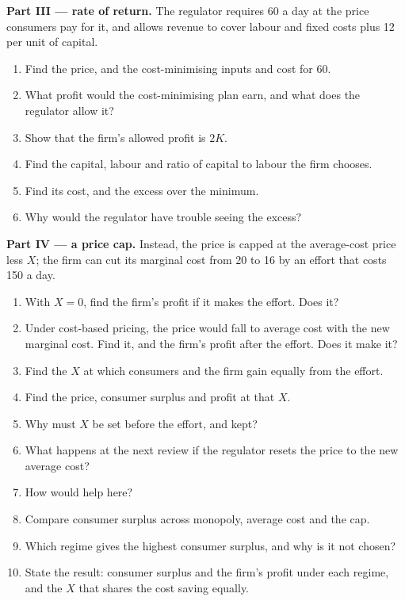 \begin{problem}
\medskip\noindent\textbf{Part III --- rate of return.} The regulator requires 60 a day at the price
consumers pay for it, and allows revenue to cover labour and fixed costs plus 12 per unit
of capital.
\begin{enumerate}[resume]
\item Find the price, and the cost-minimising inputs and cost for 60.
\item What profit would the cost-minimising plan earn, and what does the regulator
allow it?
\item Show that the firm's allowed profit is $2K$.
\item Find the capital, labour and ratio of capital to labour the firm chooses.
\item Find its cost, and the excess over the minimum.
\item Why would the regulator have trouble seeing the excess?
\end{enumerate}

\medskip\noindent\textbf{Part IV --- a price cap.} Instead, the price is capped at the
average-cost price less $X$; the firm can cut its marginal cost from 20 to 16 by an effort that
costs 150 a day.
\begin{enumerate}[resume]
\item With $X = 0$, find the firm's profit if it makes the effort. Does it?
\item Under cost-based pricing, the price would fall to average cost with the new
marginal cost. Find it, and the firm's profit after the effort. Does it make it?
\item Find the $X$ at which consumers and the firm gain equally from the effort.
\item Find the price, consumer surplus and profit at that $X$.
\item Why must $X$ be set before the effort, and kept?
\item What happens at the next review if the regulator resets the price to the new
average cost?
\item How would  help here?
\item Compare consumer surplus across monopoly, average cost and the cap.
\item Which regime gives the highest consumer surplus, and why is it not chosen?
\item State the result: consumer surplus and the firm's profit under each regime, and
the $X$ that shares the cost saving equally.
\end{enumerate}
\end{problem}
